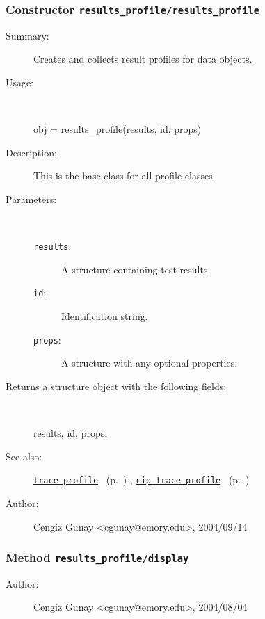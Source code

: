 \subsubsection[Constructor \texttt{results\_profile}]{Constructor \texttt{results\_profile/results\_profile}}%
%
\label{ref_results_profile__results_profile}%
\hypertarget{ref_results_profile__results_profile}{}%
\begin{description}
\item[Summary:]Creates and collects result profiles for data objects.
%
\item[Usage:]~%
\begin{lyxcode}%
obj = results\_profile(results, id, props)
%
\end{lyxcode}%
%
\item[Description:]%
This is the base class for all profile classes.
\item[Parameters:]~
\begin{description}%
\item[\texttt{results}:]
 A structure containing test results.
\item[\texttt{id}:]
 Identification string.
\item[\texttt{props}:]
 A structure with any optional properties.
\end{description}%
%
\item[Returns a structure object with the following fields:]~

	results, id, props.
%
%
\item[See also:]%
\hyperlink{ref_trace_profile}{\texttt{trace\_profile}}%
\ (p.~\pageref{ref_trace_profile})%
%
, \hyperlink{ref_cip_trace_profile}{\texttt{cip\_trace\_profile}}%
\ (p.~\pageref{ref_cip_trace_profile})%
%
%
\item[Author:]%
Cengiz Gunay <cgunay@emory.edu>, 2004/09/14%
\end{description}
\methodline%
\subsubsection[Method \texttt{display}]{Method \texttt{results\_profile/display}}%
%
\label{ref_results_profile__display}%
\hypertarget{ref_results_profile__display}{}%
\begin{description}
%
%
%
%
%
%
%
\item[Author:]%
Cengiz Gunay <cgunay@emory.edu>, 2004/08/04%
\end{description}
\methodline%
